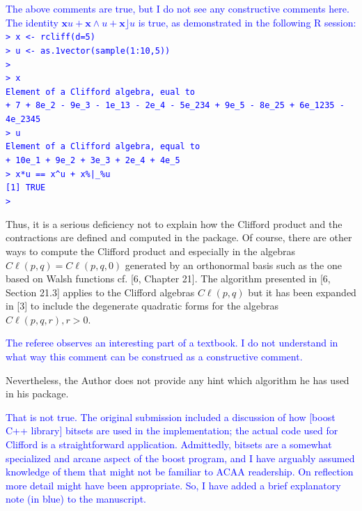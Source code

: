 \documentclass{article}
\newcommand{\cliff}[1]{\ensuremath{C\ell\left(#1\right)}}
\begin{document}
\begin{itemize}
\textcolor{blue}{The above comments are true, but I do not see any
  constructive comments here.  The identity $\mathbf{x}u +
  \mathbf{x}\wedge u+\mathbf{x}\rfloor u$ is true, as demonstrated
  in the following R session:\\[20pt]
{\tt > x <- rcliff(d=5)}\\
{\tt > u <- as.1vector(sample(1:10,5))}\\
{\tt > }\\
{\tt > x}\\
{\tt Element of a Clifford algebra, eual to}\\
{\tt + 7 + 8e\_2 - 9e\_3 - 1e\_13 - 2e\_4 - 5e\_234 + 9e\_5 - 8e\_25 + 6e\_1235 - 4e\_2345}\\
{\tt > u}\\
{\tt Element of a Clifford algebra, equal to}\\
{\tt + 10e\_1 + 9e\_2 + 3e\_3 + 2e\_4 + 4e\_5}\\
{\tt > x*u == x\string^u + x\%|\_\%u}\\
{\tt [1] TRUE}\\
{\tt > }\\
}

Thus, it is a
serious deficiency not to explain how the Clifford product and the
contractions are defined and computed in the package.  Of course,
there are other ways to compute the Clifford product and especially in
the algebras $\cliff{p, q} = \cliff{p, q, 0}$ generated by an
orthonormal basis such as the one based on Walsh functions cf. [6,
  Chapter 21]. The algorithm presented in [6, Section 21.3] applies to
the Clifford algebras \cliff{p, q} but it has been expanded in [3] to
include the degenerate quadratic forms for the algebras $\cliff{p, q,
  r}, r > 0$.

\textcolor{blue}{The referee observes an interesting part of a
  textbook.  I do not understand in what way this comment can be
  construed as a constructive comment.}

Nevertheless, the Author does not provide any hint
which algorithm he has used in his package.

\textcolor{blue}{That is not true.  The original submission included a
  discussion of how [boost C++ library] bitsets are used in the
  implementation; the actual code used for Clifford is a
  straightforward application.  Admittedly, bitsets are a somewhat
  specialized and arcane aspect of the boost program, and I have
  arguably assumed knowledge of them that might not be familiar to
  ACAA readership.  On reflection more detail might have been
  appropriate.  So, I have added a brief explanatory note (in
  \textcolor{blue}{blue}) to the manuscript.}


\end{itemize}
\end{document}
